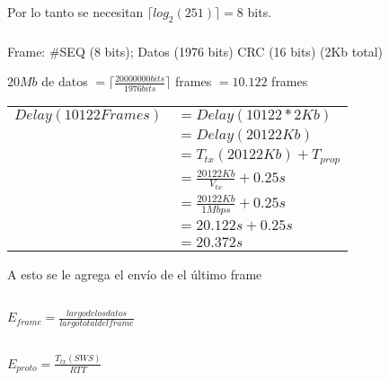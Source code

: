 Por lo tanto se necesitan $\lceil log_2(251) \rceil = 8$ bits.

\subsubsection{}
Frame: \#SEQ (8 bits); Datos (1976 bits) CRC (16 bits) (2Kb total)

$20Mb$ de datos $= \lceil \frac{20000000bits}{1976bits} \rceil$ frames $= 10.122$ frames

\begin{tabular}{rl}
$Delay(10122 Frames)$ & $= Delay(10122 * 2Kb)$ \\
& $= Delay(20122Kb)$ \\
& $= T_{tx}(20122Kb) + T_{prop}$ \\
& $= \frac{20122Kb}{V_{tx}} + 0.25s$ \\
& $= \frac{20122Kb}{1Mbps} + 0.25s$ \\
& $= 20.122s + 0.25s$ \\
& $= 20.372s$ \\
\end{tabular}

A esto se le agrega el envío de el último frame

\subsection{}

\subsubsection{}
$E_{frame} = \frac{largo de los datos}{largo total del frame} $

\subsection{}
$E_{proto} = \frac{T_{tx}(SWS)}{RTT}$